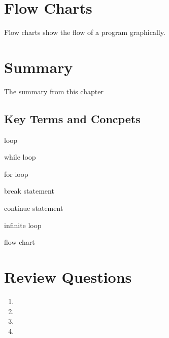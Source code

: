 \documentclass{book}
\begin{document}
    
        \section{Flow Charts}\label{flow-charts}
    




    
        Flow charts show the flow of a program graphically.
    




    
        \section{Summary}\label{summary}
    




    
        The summary from this chapter
    




    
        \subsection{Key Terms and Concpets}\label{key-terms-and-concpets}
    




    
        loop

while loop

for loop

break statement

continue statement

infinite loop

flow chart
    




    
        \section{Review Questions}\label{review-questions}
    




    
        \begin{enumerate}
\def\labelenumi{\arabic{enumi}.}
\item
\item
\item
\item
\end{enumerate}
    
\end{document}
